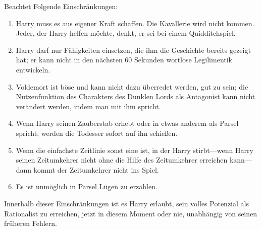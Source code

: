 {%
Beachtet Folgende Einschränkungen:
\begin{enumerate}
\item Harry muss es aus eigener Kraft schaffen. Die Kavallerie wird nicht kommen. Jeder, der Harry helfen möchte, denkt, er sei bei einem Quidditchspiel.
\item Harry darf nur Fähigkeiten einsetzen, die ihm die Geschichte bereits gezeigt hat; er kann nicht in den nächsten 60 Sekunden wortlose Legilimentik entwickeln.
\item Voldemort ist böse und kann nicht dazu überredet werden, gut zu sein; die Nutzenfunktion des Charakters des Dunklen Lords als Antagonist kann nicht verändert werden, indem man mit ihm spricht.
\item Wenn Harry seinen Zauberstab erhebt oder in etwas anderem als Parsel spricht, werden die Todesser sofort auf ihn schießen.
\item Wenn die einfachste Zeitlinie sonst eine ist, in der Harry stirbt—wenn Harry seinen Zeitumkehrer nicht ohne die Hilfe des Zeitumkehrer erreichen kann—dann kommt der Zeitumkehrer nicht ins Spiel.
\item Es ist unmöglich in Parsel Lügen zu erzählen.
\end{enumerate}

Innerhalb dieser Einschränkungen ist es Harry erlaubt, sein volles Potenzial als Rationalist zu erreichen, jetzt in diesem Moment oder nie, unabhängig von seinen früheren Fehlern.

}
